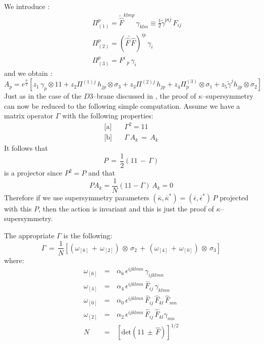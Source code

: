 \documentclass[a4paper,11pt]{article}
\def\tilde{\widetilde}
\begin{document}
We introduce :
\begin{eqnarray}
&& \Pi^{p}_{(1)} = {\tilde {\hat{F}}}^{klmp} \, \gamma_{klm} \equiv \frac{1}{2} {\tilde \gamma }^{pij} \, F_{ij} \nonumber \\
&& \Pi^{p}_{(2)} = ({\tilde {\hat{F} \, \hat{F}}})^{ip} \, \gamma_i \nonumber \\
&& \Pi^{p}_{(3)} = F^{i} \, _{p} \, \gamma_i
\end{eqnarray}
and we obtain :
\begin{equation}
A_{p} \! = \! e^{\frac{\phi}{2}}[z_1 \, \gamma_{p} \otimes 1 \! \! 1 + z_{2} \Pi^{(1) j} \, h_{jp} \otimes \sigma_{3} + z_3 \Pi^{(2) j} \, h_{jp} + z_4 \Pi^{(3)}_{p} \otimes \sigma_1 + z_5 {\tilde \gamma}^{j} h_{jp} \otimes \sigma_2]
\label{A con Pi}
\end{equation}
Just as in the case of the $D3$--brane discussed in
\cite{noidued3}, the proof of $\kappa$--supersymmetry can now be reduced to the
following simple computation. Assume we have a matrix operator $\Gamma$
with the following properties:
\begin{eqnarray}
  \mbox{[a]}&\,& \Gamma^{2} = 1 \! \!  1 \nonumber\\
  \mbox{[b]}&\,& \Gamma \, A_{k} \, = \,  A_{k}
  \label{properte}
\end{eqnarray}
It follows that
\begin{equation}
P \, = \, \frac{1}{2} ( 1 \! \!  1 \, - \, \Gamma)
\label{proyector}
\end{equation}
is a projector since $P^2 = P$ and that
\begin{equation}
P A_{k} = \frac{1}{N}(1 \! \! 1 - \Gamma) \, A_{k} = 0
\label{k supersi pro}
\end{equation}
Therefore if we use supersymmetry parameters $\left( \overline{\kappa} , \overline{\kappa}^*\right)  =
\left (\overline{\epsilon} ,
\overline{\epsilon} ^*\right) \, P$ projected with this $P$, then the
action is invariant and this is just the proof of
$\kappa$--supersymmetry.
\par
The appropriate $ \Gamma $ is the following:
\begin{equation}
\Gamma \, = \, \frac{1}{N} [(\omega_{[6]} \, + \, \omega_{[2]}) \, \otimes \,
\sigma_{2} \, + \, (\omega_{[4]} \, + \, \omega_{[0]}) \, \otimes \, \sigma_{3}]
\label{def gamma}
\end{equation}
where:
\begin{eqnarray}
\omega_{[6]} \, & = & \, \alpha_{6} \, \epsilon^{ijklmn} \, \gamma_{ijklmn} \nonumber \\
\omega_{[4]} \, & = & \, \alpha_{4} \,  \epsilon^{ijklmn} \, \hat{F}_{ij} \, \gamma_{klmn} \nonumber \\
\omega_{[0]} \, & = & \, \alpha_{0} \,\epsilon^{ijklmn} \, \hat{F}_{ij} \, \hat{F}_{kl} \, \hat{F}_{mn} \nonumber\\
\omega_{[2]} \, & = & \, \alpha_{2} \, \epsilon^{ijklmn} \, \hat{F}_{ij} \, \hat{F}_{kl} \gamma_{mn} \nonumber \\
N \, & = & \, \left[ \mbox{det} \left( 1 \! \!  1 \, \pm \, \hat{F} \right) \right] ^{1/2}
\label{def omega}
\end{eqnarray}
\end{document}
